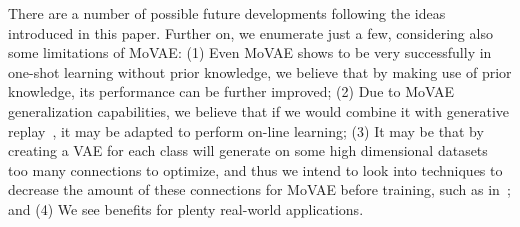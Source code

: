\documentclass[sigconf,authorversion=true]{aamas}  %
\begin{document}
There are a number of possible future developments following the ideas introduced in this paper. Further on, we enumerate just a few, considering also some limitations of MoVAE: (1) Even MoVAE shows to be very successfully in one-shot learning without prior knowledge, we believe that by making use of prior knowledge, its performance can be further improved; (2) Due to MoVAE generalization capabilities, we believe that if we would combine it with generative replay~\cite{generativereplay2016}, it may be adapted to perform on-line learning; (3) It may be that by creating a VAE for each class will generate on some high dimensional datasets too many connections to optimize, and thus we intend to look into techniques to decrease the amount of these connections for MoVAE before training, such as in~\cite{Mocanu2016xbm}; and (4) We see benefits for plenty real-world applications.
\end{document}

